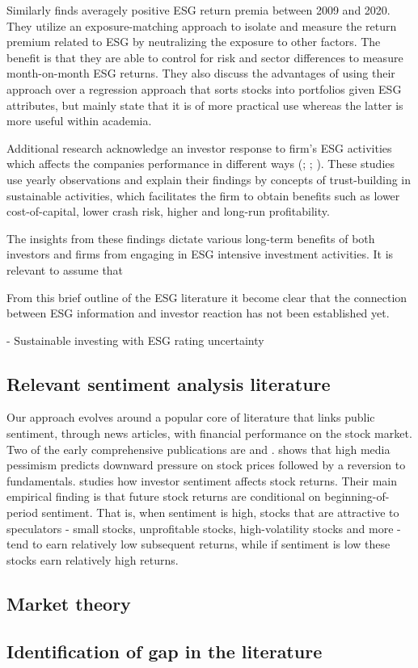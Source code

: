 Similarly \cite{ESG_exposure_approach} finds averagely positive ESG return premia between 2009 and 2020. They utilize an exposure-matching approach to isolate and measure the return premium related to ESG by neutralizing the exposure to other factors. The benefit is that they are able to control for risk and sector differences to measure month-on-month ESG returns. They also discuss the advantages of using their approach over a regression approach that sorts stocks into portfolios given ESG attributes, but mainly state that it is of more practical use whereas the latter is more useful within academia.

Additional research acknowledge an investor response to firm's ESG activities which affects the companies performance in different ways (\cite{lins2017social}; \cite{kim2014corporate}; \cite{el2011does}). These studies use yearly observations and explain their findings by concepts of trust-building in sustainable activities, which facilitates the firm to obtain benefits such as lower cost-of-capital, lower crash risk, higher and long-run profitability.

The insights from these findings dictate various long-term benefits of both investors and firms from engaging in ESG intensive investment activities. It is relevant to assume that    


From this brief outline of the ESG literature it become clear that the connection between ESG information and investor reaction has not been established yet. 


- Sustainable investing with ESG rating uncertainty


\subsection{Relevant sentiment analysis literature}

Our approach evolves around a popular core of literature that links public sentiment, through news articles, with financial performance on the stock market. Two of the early comprehensive publications are \cite{tetlock_sentiment} and \cite{baker_sentiment}. \citeauthor{tetlock_sentiment} shows that high media pessimism predicts downward pressure on stock prices followed by a reversion to fundamentals. \citeauthor{baker_sentiment} studies how investor sentiment affects stock returns. Their main empirical finding is that future stock returns are conditional on beginning-of-period sentiment. That is, when sentiment is high, stocks that are attractive to speculators - small stocks, unprofitable stocks, high-volatility stocks and more - tend to earn relatively low subsequent returns, while if sentiment is low these stocks earn relatively high returns.   




\subsection{Market theory}




\subsection{Identification of gap in the literature}


